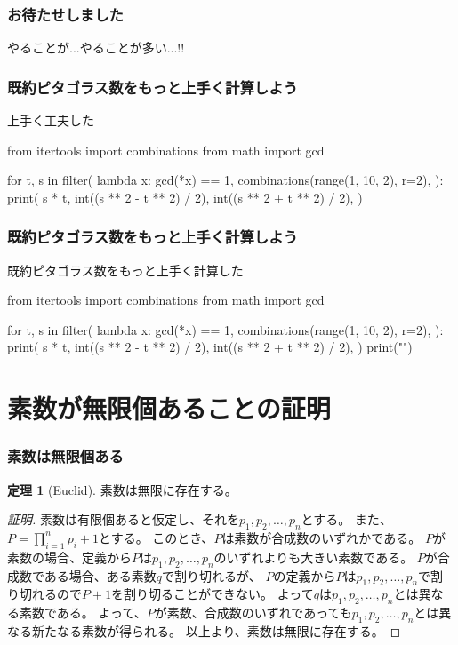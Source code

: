 \documentclass[dvipdfmx,11pt,notheorems]{beamer}
\theoremstyle{definition}
\newtheorem{theorem}{定理}
\begin{document}
\begin{frame}\frametitle{お待たせしました}
\huge{やることが...やることが多い...!!}
\end{frame}


\begin{frame}[fragile]\frametitle{既約ピタゴラス数をもっと上手く計算しよう}

\begin{block}{上手く工夫した}
\begin{pyverbatim}
from itertools import combinations
from math import gcd

for t, s in filter(
    lambda x: gcd(*x) == 1,
    combinations(range(1, 10, 2), r=2),
):
    print(
        s * t,
        int((s ** 2 - t ** 2) / 2),
        int((s ** 2 + t ** 2) / 2),
    )
\end{pyverbatim}
\end{block}

\end{frame}

\begin{frame}[fragile]\frametitle{既約ピタゴラス数をもっと上手く計算しよう}

\begin{block}{既約ピタゴラス数をもっと上手く計算した}
\begin{pycode}
from itertools import combinations
from math import gcd

for t, s in filter(
    lambda x: gcd(*x) == 1,
    combinations(range(1, 10, 2), r=2),
):
    print(
        s * t,
        int((s ** 2 - t ** 2) / 2),
        int((s ** 2 + t ** 2) / 2),
    )
    print("\n")
\end{pycode}
\end{block}

\end{frame}




\section{素数が無限個あることの証明}

\begin{frame}\frametitle{素数は無限個ある}

\begin{theorem}[Euclid]
素数は無限に存在する。
\end{theorem}

\begin{proof}[証明]

素数は有限個あると仮定し、それを$p_{1}, p_{2}, \dots,  p_{n}$とする。
また、$P = \displaystyle \prod^{n}_{i=1}p_{i} + 1$とする。
このとき、$P$は素数が合成数のいずれかである。
$P$が素数の場合、定義から$P$は$p_{1}, p_{2}, \dots,  p_{n}$のいずれよりも大きい素数である。
$P$が合成数である場合、ある素数$q$で割り切れるが、
$P$の定義から$P$は$p_{1}, p_{2}, \dots,  p_{n}$で割り切れるので$P+1$を割り切ることができない。
よって$q$は$p_{1}, p_{2}, \dots,  p_{n}$とは異なる素数である。
よって、$P$が素数、合成数のいずれであっても$p_{1}, p_{2}, \dots,  p_{n}$とは異なる新たなる素数が得られる。
以上より、素数は無限に存在する。
\end{proof}

\end{frame}
\end{document}
